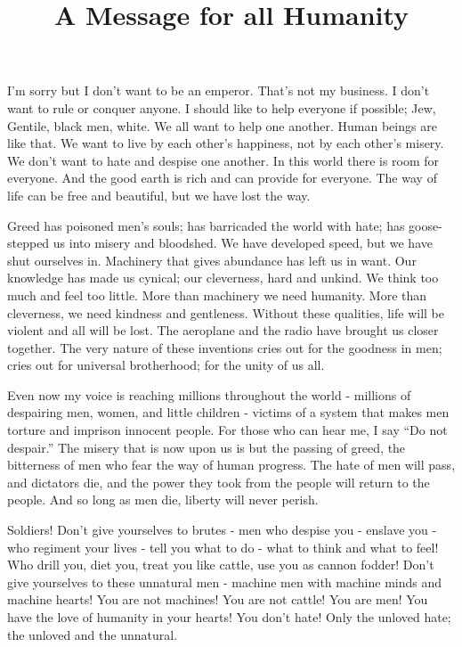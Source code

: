 \documentclass[12pt, a4paper]{article}
\title{\vspace{-6ex} A Message for all Humanity \cite{charlie}}
\date{\vspace{-8ex}}
\begin{document}
\maketitle

I'm sorry but I don't want to be an emperor.
That's not my business.
I don't want to rule or conquer anyone.
I should like to help everyone if possible; Jew, Gentile, black men, white.
We all want to help one another.
Human beings are like that.
We want to live by each other's happiness, not by each other's misery.
We don't want to hate and despise one another.
In this world there is room for everyone.
And the good earth is rich and can provide for everyone.
The way of life can be free and beautiful, but we have lost the way.

Greed has poisoned men's souls; has barricaded the world with hate; has
goose-stepped us into misery and bloodshed.
We have developed speed, but we have shut ourselves in.
Machinery that gives abundance has left us in want.
Our knowledge has made us cynical; our cleverness, hard and unkind.
We think too much and feel too little.
More than machinery we need humanity.
More than cleverness, we need kindness and gentleness.
Without these qualities, life will be violent and all will be lost.
The aeroplane and the radio have brought us closer together.
The very nature of these inventions cries out for the goodness in men; cries out
for universal brotherhood; for the unity of us all.

Even now my voice is reaching millions throughout the world - millions of
despairing men, women, and little children - victims of a system that makes men
torture and imprison innocent people.
For those who can hear me, I say ``Do not despair.''
The misery that is now upon us is but the passing of greed, the bitterness of
men who fear the way of human progress.
The hate of men will pass, and dictators die, and the power they took from the
people will return to the people.
And so long as men die, liberty will never perish.

Soldiers!
Don't give yourselves to brutes - men who despise you - enslave you - who
regiment your lives - tell you what to do - what to think and what to feel!
Who drill you, diet you, treat you like cattle, use you as cannon fodder!
Don't give yourselves to these unnatural men - machine men with machine minds
and machine hearts!
You are not machines!
You are not cattle!
You are men!
You have the love of humanity in your hearts!
You don't hate!
Only the unloved hate; the unloved and the unnatural.
\end{document}

